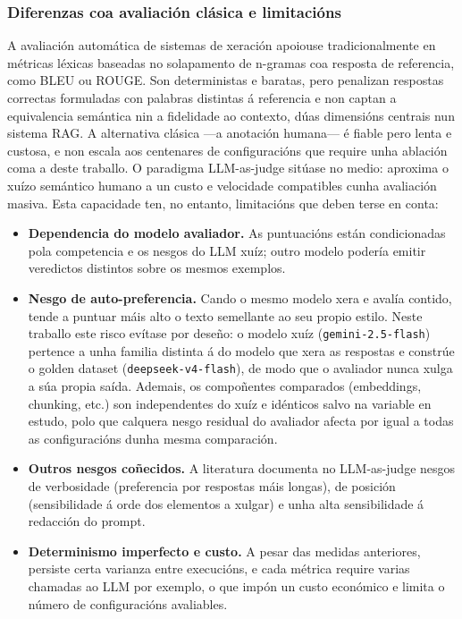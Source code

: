 \documentclass[11pt, a4paper, oneside]{report}
\begin{document}
\subsubsection{Diferenzas coa avaliación clásica e limitacións}
\label{sec:llm_judge_limitacions}

A avaliación automática de sistemas de xeración apoiouse tradicionalmente en métricas
léxicas baseadas no solapamento de n-gramas coa resposta de referencia, como BLEU ou
ROUGE. Son deterministas e baratas, pero penalizan respostas correctas formuladas con
palabras distintas á referencia e non captan a equivalencia semántica nin a fidelidade ao
contexto, dúas dimensións centrais nun sistema RAG. A alternativa clásica —a anotación
humana— é fiable pero lenta e custosa, e non escala aos centenares de configuracións que
require unha ablación coma a deste traballo. O paradigma LLM-as-judge sitúase no medio:
aproxima o xuízo semántico humano a un custo e velocidade compatibles cunha avaliación
masiva. Esta capacidade ten, no entanto, limitacións que deben terse en conta:

\begin{itemize}
  \item \textbf{Dependencia do modelo avaliador.} As puntuacións están condicionadas pola
    competencia e os nesgos do LLM xuíz; outro modelo podería emitir veredictos distintos
    sobre os mesmos exemplos.
  \item \textbf{Nesgo de auto-preferencia.} Cando o mesmo modelo xera e avalía contido,
    tende a puntuar máis alto o texto semellante ao seu propio estilo. Neste traballo este
    risco evítase por deseño: o modelo xuíz (\texttt{gemini-2.5-flash}) pertence a unha
    familia distinta á do modelo que xera as respostas e constrúe o golden dataset
    (\texttt{deepseek-v4-flash}), de modo que o avaliador nunca xulga a súa propia saída.
    Ademais, os compoñentes comparados (embeddings, chunking, etc.) son independentes do
    xuíz e idénticos salvo na variable en estudo, polo que calquera nesgo residual do
    avaliador afecta por igual a todas as configuracións dunha mesma comparación.
  \item \textbf{Outros nesgos coñecidos.} A literatura documenta no LLM-as-judge nesgos de
    verbosidade (preferencia por respostas máis longas), de posición (sensibilidade á orde
    dos elementos a xulgar) e unha alta sensibilidade á redacción do prompt.
  \item \textbf{Determinismo imperfecto e custo.} A pesar das medidas anteriores, persiste
    certa varianza entre execucións, e cada métrica require varias chamadas ao LLM por
    exemplo, o que impón un custo económico e limita o número de configuracións avaliables.
\end{itemize}
\end{document}
